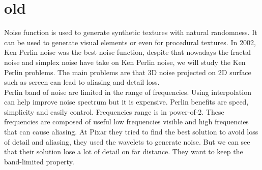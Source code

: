 \documentclass[11pt,a4paper]{article}
\begin{document}
\section{old}
Noise function is used to generate synthetic textures with natural randomness. It can be used to generate visual elements or even for procedural textures. In 2002, Ken Perlin noise was the best noise function, despite that nowadays the fractal noise and simplex noise have take on Ken Perlin noise, we will study the Ken Perlin problems. The main problems are that 3D noise projected on 2D surface such as screen can lead to aliasing and detail loss.
\\
Perlin band of noise are limited in the range of frequencies. Using interpolation can help improve noise spectrum but it is expensive.
Perlin benefits are speed, simplicity and easily control. Frequencies range is in power-of-2. These frequencies are composed of useful low frequencies visible and high frequencies that can cause aliasing.
At Pixar they tried to find the best solution to avoid loss of detail and aliasing, they used the wavelets to generate noise. But we can see that their solution lose a lot of detail on far distance. They want to keep the band-limited property.
\\\\
\end{document}
